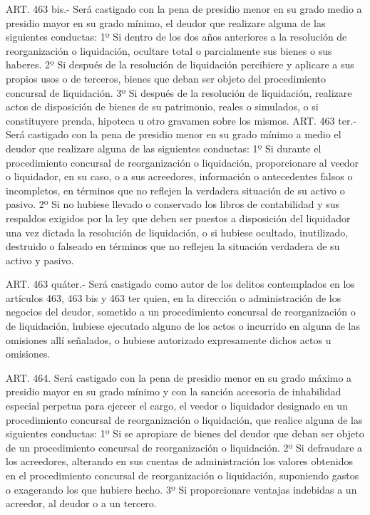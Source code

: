     ART. 463 bis.-
    Será castigado con la pena de presidio menor en su grado medio a presidio mayor en su grado mínimo, el deudor que realizare alguna de las siguientes conductas:
    1º Si dentro de los dos años anteriores a la resolución de reorganización o liquidación, ocultare total o parcialmente sus bienes o sus haberes.
    2º Si después de la resolución de liquidación percibiere y aplicare a sus propios usos o de terceros, bienes que deban ser objeto del procedimiento concursal de liquidación.
    3º Si después de la resolución de liquidación, realizare actos de disposición de bienes de su patrimonio, reales o simulados, o si constituyere prenda, hipoteca u otro gravamen sobre los mismos.
    ART. 463 ter.-
    Será castigado con la pena de presidio menor en su grado mínimo a medio el deudor que realizare alguna de las siguientes conductas:
    1º Si durante el procedimiento concursal de reorganización o liquidación, proporcionare al veedor o liquidador, en su caso, o a sus acreedores, información o antecedentes falsos o incompletos, en términos que no reflejen la verdadera situación de su activo o pasivo.
    2º Si no hubiese llevado o conservado los libros de contabilidad y sus respaldos exigidos por la ley que deben ser puestos a disposición del liquidador una vez dictada la resolución de liquidación, o si hubiese ocultado, inutilizado, destruido o falseado en términos que no reflejen la situación verdadera de su activo y pasivo.

    ART. 463 quáter.-
    Será castigado como autor de los delitos contemplados en los artículos 463, 463 bis y 463 ter quien, en la dirección o administración de los negocios del deudor, sometido a un procedimiento concursal de reorganización o de liquidación, hubiese ejecutado alguno de los actos o incurrido en alguna de las omisiones allí señalados, o hubiese autorizado expresamente dichos actos u omisiones.



    ART. 464.
    Será castigado con la pena de presidio menor en su grado máximo a presidio mayor en su grado mínimo y con la sanción accesoria de inhabilidad especial perpetua para ejercer el cargo, el veedor o liquidador designado en un procedimiento concursal de reorganización o liquidación, que realice alguna de las siguientes conductas:
    1º Si se apropiare de bienes del deudor que deban ser objeto de un procedimiento concursal de reorganización o liquidación.
    2º Si defraudare a los acreedores, alterando en sus cuentas de administración los valores obtenidos en el procedimiento concursal de reorganización o liquidación, suponiendo gastos o exagerando los que hubiere hecho.
    3º Si proporcionare ventajas indebidas a un acreedor, al deudor o a un tercero.


